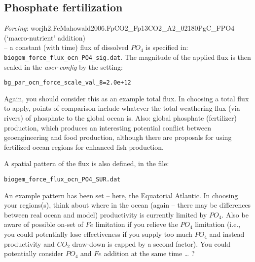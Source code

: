\documentclass[11pt,fleqn]{book} %
\begin{document}
\subsection{Phosphate fertilization}

\vspace{2mm}
\textit{Forcing}: \textsf{\footnotesize worjh2.FeMahowald2006.FpCO2\_Fp13CO2\_A2\_02180PgC\_FPO4} (‘macro-nutrient’ addition)
\vspace{1mm}
\\ -- a constant (with time) flux of dissolved \(PO_{4}\) is specified in: \texttt{biogem\_force\_flux\_ocn\_PO4\_sig.dat}. The magnitude of the applied flux is then scaled in the \textit{user-config} by the setting:
\vspace{-2mm}\small\begin{verbatim}
bg_par_ocn_force_scale_val_8=2.0e+12
\end{verbatim}\normalsize\vspace{-2mm}

Again, you should consider this as an example total flux. In choosing a total flux to apply, points of comparison include whatever the total weathering flux (via rivers) of phosphate to the global ocean is. Also: global phosphate (fertilizer) production, which produces an interesting potential conflict between geoengineering and food production, although there are proposals for using fertilized ocean regions for enhanced fish production.

\vspace{1mm}
A spatial pattern of the flux is also defined, in the file:
\vspace{-2mm}\small\begin{verbatim}
biogem_force_flux_ocn_PO4_SUR.dat
\end{verbatim}\normalsize\vspace{-2mm}

An example pattern has been set – here, the Equatorial Atlantic. In choosing your regions(s), think about where in the ocean (again – there may be differences between real ocean and model) productivity is currently limited by \(PO_{4}\). Also be aware of possible on-set of \(Fe\) limitation if you relieve the  \(PO_{4}\) limitation (i.e., you could potentially lose effectiveness if you supply too much  \(PO_{4}\) and instead productivity and \(CO_{2}\) draw-down is capped by a second factor). You could potentially consider  \(PO_{4}\) and \(Fe\) addition at the same time … ?

\end{document}
